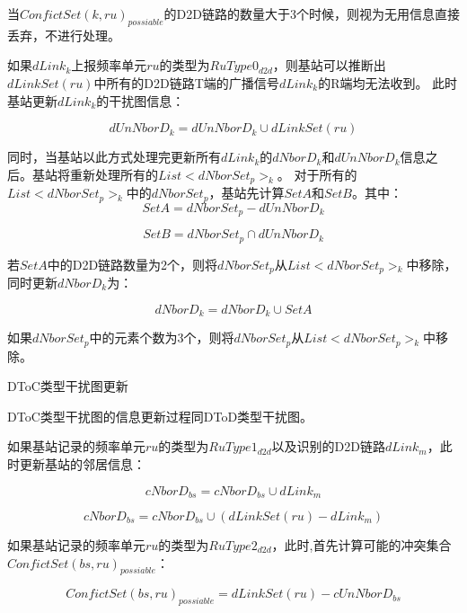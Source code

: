 \documentclass[figurelist,tablelist,algorithmlist,nomlist,masters]{seuthesix}
\begin{document}
	当$ConfictSet{(k,ru)_{possiable}}$的D2D链路的数量大于3个时候，则视为无用信息直接丢弃，不进行处理。
	
	
	如果$dLink_k$上报频率单元$ru$的类型为$RuType{0_{d2d}}$，则基站可以推断出$dLinkSet(ru)$中所有的D2D链路T端的广播信号$dLink_k$的R端均无法收到。
	此时基站更新$dLink_k$的干扰图信息：
	
	\begin{equation}\label{eq2.1}
	dUnNborD_k = dUnNborD_k \cup dLinkSet(ru)
	\end{equation}
	
	同时，当基站以此方式处理完更新所有$dLink_k$的$dNborD_k$和$dUnNborD_k$信息之后。基站将重新处理所有的$List < dNborSet_{p}{ > _k}$。
	对于所有的$List < dNborSet_{p}{ > _k}$中的$dNborSet_{p}$，基站先计算$SetA$和$SetB$。其中：
	\begin{equation}\label{eq2.1}
	SetA = dNborSet_{p} - dUnNborD_k
	\end{equation}
	
	\begin{equation}\label{eq2.1}
	SetB = dNborSet_{p} \cap dUnNborD_k
	\end{equation}
	
	若$SetA$中的D2D链路数量为2个，则将$dNborSet_{p}$从$List < dNborSet_{p}{ > _k}$中移除，同时更新$dNborD_k$为：
	
	\begin{equation}\label{eq2.1}
	dNborD_k = dNborD_k \cup SetA
	\end{equation}
	
	如果$dNborSet_{p}$中的元素个数为3个，则将$dNborSet_{p}$从$List < dNborSet_{p}{ > _k}$中移除。  
	
	
	DToC类型干扰图更新
	
	DToC类型干扰图的信息更新过程同DToD类型干扰图。
	
	如果基站记录的频率单元$ru$的类型为$RuType{1_{d2d}}$以及识别的D2D链路$dLink_m$，此时更新基站的邻居信息：
	
	\begin{equation}\label{eq2.1}
	cNborD_{bs} = cNborD_{bs} \cup dLink_m
	\end{equation}
	
	\begin{equation}\label{eq2.1}
	cNborD_{bs} = cNborD_{bs} \cup (dLinkSet(ru) - dLink_m)
	\end{equation}
	
	如果基站记录的频率单元$ru$的类型为$RuType{2_{d2d}}$，此时,首先计算可能的冲突集合$ConfictSet{(bs,ru)_{possiable}}$：
	
	\begin{equation}\label{eq2.1}
	ConfictSet{(bs,ru)_{possiable}} = dLinkSet(ru) - cUnNborD_{bs}
	\end{equation}
	
\end{document}

